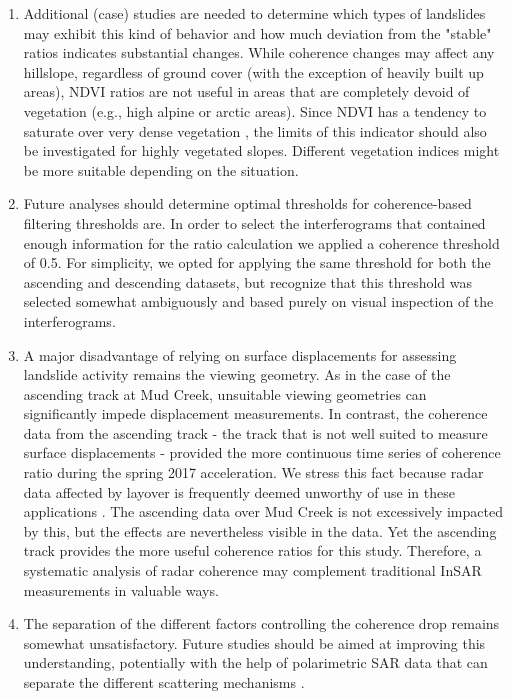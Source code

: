 \documentclass[nhess, manuscript]{copernicus}
\begin{document}
\begin{enumerate}
\item Additional (case) studies are needed to determine which types of landslides may exhibit this kind of behavior and how much deviation from the "stable" ratios indicates substantial changes. While coherence changes may affect any hillslope, regardless of ground cover (with the exception of heavily built up areas), NDVI ratios are not useful in areas that are completely devoid of vegetation (e.g., high alpine or arctic areas). Since NDVI has a tendency to saturate over very dense vegetation \citep{lillesand2015}, the limits of this indicator should also be investigated for highly vegetated slopes. Different vegetation indices might be more suitable depending on the situation.
\item Future analyses should determine optimal thresholds for coherence-based filtering thresholds are. In order to select the interferograms that contained enough information for the ratio calculation we applied a coherence threshold of 0.5. For simplicity, we opted for applying the same threshold for both the ascending and descending datasets, but recognize that this threshold was selected somewhat ambiguously and based purely on visual inspection of the interferograms.
\item A major disadvantage of relying on surface displacements for assessing landslide activity remains the viewing geometry. As in the case of the ascending track at Mud Creek, unsuitable viewing geometries can significantly impede displacement measurements. In contrast, the coherence data from the ascending track - the track that is not well suited to measure surface displacements - provided the more continuous time series of coherence ratio during the spring 2017 acceleration. We stress this fact because radar data affected by layover is frequently deemed unworthy of use in these applications \citep[e.g.][]{lauknes2010, wasowski2014, ohki2020}. The ascending data over Mud Creek is not excessively impacted by this, but the effects are nevertheless visible in the data. Yet the ascending track provides the more useful coherence ratios for this study. Therefore, a systematic analysis of radar coherence may complement traditional InSAR measurements in valuable ways.
\item The separation of the different factors controlling the coherence drop remains somewhat unsatisfactory. Future studies should be aimed at improving this understanding, potentially with the help of polarimetric SAR data that can separate the different scattering mechanisms \citep{ferro-famil2016}. 

\end{enumerate}
\end{document}

